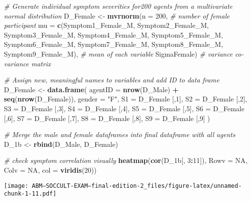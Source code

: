 \documentclass[]{article}
\newenvironment{Shaded}{\begin{snugshade}}{\end{snugshade}}
\newcommand{\KeywordTok}[1]{\textcolor[rgb]{0.13,0.29,0.53}{\textbf{#1}}}
\newcommand{\DataTypeTok}[1]{\textcolor[rgb]{0.13,0.29,0.53}{#1}}
\newcommand{\DecValTok}[1]{\textcolor[rgb]{0.00,0.00,0.81}{#1}}
\newcommand{\StringTok}[1]{\textcolor[rgb]{0.31,0.60,0.02}{#1}}
\newcommand{\CommentTok}[1]{\textcolor[rgb]{0.56,0.35,0.01}{\textit{#1}}}
\newcommand{\OtherTok}[1]{\textcolor[rgb]{0.56,0.35,0.01}{#1}}
\newcommand{\OperatorTok}[1]{\textcolor[rgb]{0.81,0.36,0.00}{\textbf{#1}}}
\newcommand{\NormalTok}[1]{#1}
\begin{document}
\begin{Shaded}
\begin{Highlighting}[]
\CommentTok{# Generate individual symptom severities for200 agents from a multivariate normal distribution}
\NormalTok{D_Female <-}\StringTok{ }\KeywordTok{mvrnorm}\NormalTok{(}\DataTypeTok{n =} \DecValTok{200}\NormalTok{, }\CommentTok{# number of female participant}
                    \DataTypeTok{mu =} \KeywordTok{c}\NormalTok{(Symptom1_Female_M, Symptom2_Female_M, Symptom3_Female_M, Symptom4_Female_M, Symptom5_Female_M, Symptom6_Female_M, Symptom7_Female_M, Symptom8_Female_M, Symptom9_Female_M), }\CommentTok{# mean of each variable}
\NormalTok{                    SigmaFemale) }\CommentTok{# variance co-variance matrix}

\CommentTok{# Assign new, meaningful names to variables and add ID to data frame}
\NormalTok{D_Female <-}\StringTok{ }\KeywordTok{data.frame}\NormalTok{(}
  \DataTypeTok{agentID =} \KeywordTok{nrow}\NormalTok{(D_Male) }\OperatorTok{+}\StringTok{ }\KeywordTok{seq}\NormalTok{(}\KeywordTok{nrow}\NormalTok{(D_Female)),}
  \DataTypeTok{gender =} \StringTok{"F"}\NormalTok{,}
  \DataTypeTok{S1 =}\NormalTok{ D_Female [,}\DecValTok{1}\NormalTok{],}
  \DataTypeTok{S2 =}\NormalTok{  D_Female [,}\DecValTok{2}\NormalTok{],}
  \DataTypeTok{S3 =}\NormalTok{  D_Female [,}\DecValTok{3}\NormalTok{],}
  \DataTypeTok{S4 =}\NormalTok{ D_Female [,}\DecValTok{4}\NormalTok{],}
  \DataTypeTok{S5 =}\NormalTok{ D_Female [,}\DecValTok{5}\NormalTok{],}
  \DataTypeTok{S6 =}\NormalTok{  D_Female [,}\DecValTok{6}\NormalTok{],}
  \DataTypeTok{S7 =}\NormalTok{  D_Female [,}\DecValTok{7}\NormalTok{],}
  \DataTypeTok{S8 =}\NormalTok{ D_Female [,}\DecValTok{8}\NormalTok{],}
  \DataTypeTok{S9 =}\NormalTok{ D_Female [,}\DecValTok{9}\NormalTok{]}
\NormalTok{)}

\CommentTok{# Merge the male and female dataframes into final dataframe with all agents}
\NormalTok{D_1b <-}\StringTok{ }\KeywordTok{rbind}\NormalTok{(D_Male, D_Female)}


\CommentTok{# check symptom correlation visually}
\KeywordTok{heatmap}\NormalTok{(}\KeywordTok{cor}\NormalTok{(D_1b[, }\DecValTok{3}\OperatorTok{:}\DecValTok{11}\NormalTok{]), }\DataTypeTok{Rowv =} \OtherTok{NA}\NormalTok{, }\DataTypeTok{Colv =} \OtherTok{NA}\NormalTok{, }\DataTypeTok{col =} \KeywordTok{viridis}\NormalTok{(}\DecValTok{20}\NormalTok{))}
\end{Highlighting}
\end{Shaded}

\texttt{[image: ABM---SOCCULT-EXAM---final-edition-2\_files/figure-latex/unnamed-chunk-1-11.pdf]}
\end{document}
